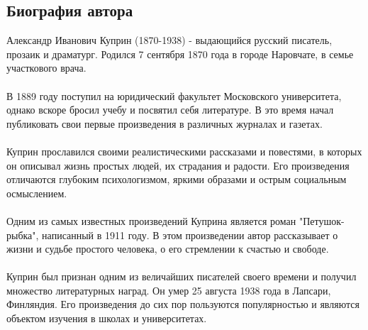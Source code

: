 \documentclass{article}
\begin{document}
\subsection{Биография автора}
Александр Иванович Куприн (1870-1938) - выдающийся русский писатель, прозаик и драматург. Родился 7 сентября 1870 года в городе Наровчате, в семье участкового врача.\\
~\\
В 1889 году поступил на юридический факультет Московского университета, однако вскоре бросил учебу и посвятил себя литературе. В это время начал публиковать свои первые произведения в различных журналах и газетах.\\
~\\
Куприн прославился своими реалистическими рассказами и повестями, в которых он описывал жизнь простых людей, их страдания и радости. Его произведения отличаются глубоким психологизмом, яркими образами и острым социальным осмыслением.\\
~\\
Одним из самых известных произведений Куприна является роман "{}{}Петушок-рыбка"{}{}, написанный в 1911 году. В этом произведении автор рассказывает о жизни и судьбе простого человека, о его стремлении к счастью и свободе.\\
~\\
Куприн был признан одним из величайших писателей своего времени и получил множество литературных наград. Он умер 25 августа 1938 года в Лапсари, Финляндия. Его произведения до сих пор пользуются популярностью и являются объектом изучения в школах и университетах.
\end{document}
